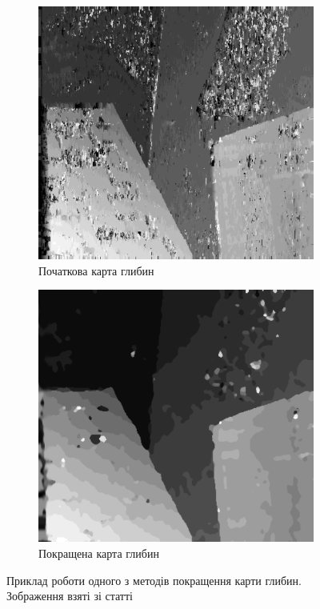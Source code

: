 \begin{figure}[h]
  \centering
  \begin{subfigure}[t]{0.45\textwidth}
      \centering
      \includegraphics[width=\textwidth]{images/refinement_initial}
      \caption{Початкова карта глибин}
  \end{subfigure}
  \hfill
  \begin{subfigure}[t]{0.45\textwidth}
      \centering
      \includegraphics[width=\textwidth]{images/refinement_result}
      \caption{Покращена карта глибин}
  \end{subfigure}
  \caption{Приклад роботи одного з методів покращення карти глибин.
           Зображення взяті зі статті \cite{refinement}}
  \label{fig:refinement}
\end{figure}

